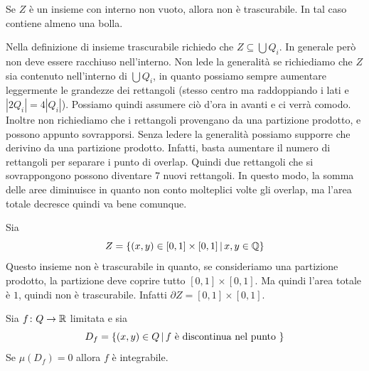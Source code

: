 \documentclass[a4paper]{article}
\begin{document}
Se \(Z\) è un insieme con interno non vuoto, allora non è trascurabile.
In tal caso contiene almeno una bolla.

Nella definizione di insieme trascurabile
richiedo che \(Z \subseteq \bigcup Q_i\).
In generale però non deve essere racchiuso nell'interno.
Non lede la generalità se richiediamo che \(Z\) sia contenuto nell'interno
di \(\bigcup Q_i\), in quanto possiamo sempre aumentare leggermente le grandezze dei rettangoli
(stesso centro ma raddoppiando i lati e \(|2Q_i| = 4|Q_i|\)).
Possiamo quindi assumere ciò d'ora in avanti e ci verrà comodo.
Inoltre non richiediamo che i rettangoli provengano da una partizione prodotto,
e possono appunto sovrapporsi.
Senza ledere la generalità possiamo supporre che derivino da una partizione prodotto.
Infatti, basta aumentare il numero di rettangoli per separare i punto di overlap.
Quindi due rettangoli che si sovrappongono possono diventare 7 nuovi rettangoli.
In questo modo, la somma delle aree diminuisce in quanto non conto molteplici volte gli overlap,
ma l'area totale decresce quindi va bene comunque.

\begin{snippetexample}{}
    Sia \[
        Z = \{(x,y) \in [0,1] \times [0,1] \,|\, x,y \in \mathbb{Q}\}
    \]
    Questo insieme non è trascurabile in quanto, se consideriamo una partizione
    prodotto, la partizione deve coprire tutto \([0,1] \times [0,1]\).
    Ma quindi l'area totale è \(1\), quindi non è trascurabile.
    Infatti \(\partial Z = [0,1] \times [0,1]\).
\end{snippetexample}

\begin{snippettheorem}{}
    Sia \(f \colon Q \to \mathbb{R}\) limitata e sia \[D_f = \{(x,y) \in Q \,|\, f \text{ è discontinua nel punto }\}\]
    Se \(\mu(D_f) = 0\) allora \(f\) è integrabile.
\end{snippettheorem}
\end{document}
